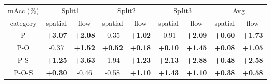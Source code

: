 \begin {tabular}{|c|cccccccc|}%
\hline mAcc (\%) & \multicolumn {2}{c}{Split1} & \multicolumn {2}{c}{Split2} & \multicolumn {2}{c}{Split3} & \multicolumn {2}{c|}{Avg}\\category&spatial&flow&spatial&flow&spatial&flow&spatial&flow\\\hline %
P&\bfseries {+3.07}&\bfseries {+2.08}&-0.35&\bfseries {+1.02}&-0.91&\bfseries {+2.09}&\bfseries {+0.60}&\bfseries {+1.73}\\%
P-O&-0.37&\bfseries {+1.52}&\bfseries {+0.52}&\bfseries {+0.18}&\bfseries {+0.10}&\bfseries {+1.45}&\bfseries {+0.08}&\bfseries {+1.05}\\%
P-S&\bfseries {+1.25}&\bfseries {+3.63}&-1.94&\bfseries {+1.23}&\bfseries {+2.13}&\bfseries {+2.88}&\bfseries {+0.48}&\bfseries {+2.58}\\%
P-O-S&\bfseries {+0.30}&-0.46&-0.58&\bfseries {+1.10}&\bfseries {+1.43}&\bfseries {+1.10}&\bfseries {+0.38}&\bfseries {+0.58}\\\hline %
\end {tabular}%
